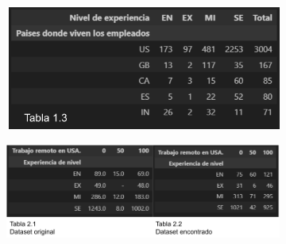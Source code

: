 \documentclass{article}
\begin{document}
	\begin{figure}[htbp] %
		\begin{subfigure}[b]{1.1\textwidth}
			\includegraphics[width=\textwidth]{FigurasTablas/tabla1.3.png}
			\label{tabla 1.3}
		\end{subfigure}
	
		\begin{subfigure}[b]{1.1\textwidth}
			\includegraphics[width=1.2\textwidth]{FigurasTablas/tablasDinamicas2.1y2.2.png}
			\label{tablasDinamicas2.1y2.2}
		\end{subfigure}	
	\end{figure}
\end{document}
